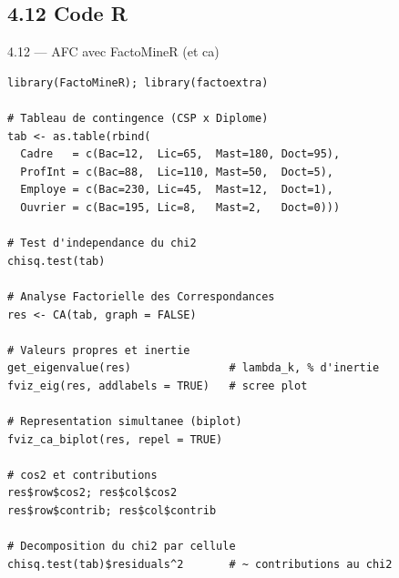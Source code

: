 \subsection{4.12 Code R}
\begin{frame}[fragile]{4.12 — AFC avec FactoMineR (et ca)}
\begin{lstlisting}
library(FactoMineR); library(factoextra)

# Tableau de contingence (CSP x Diplome)
tab <- as.table(rbind(
  Cadre   = c(Bac=12,  Lic=65,  Mast=180, Doct=95),
  ProfInt = c(Bac=88,  Lic=110, Mast=50,  Doct=5),
  Employe = c(Bac=230, Lic=45,  Mast=12,  Doct=1),
  Ouvrier = c(Bac=195, Lic=8,   Mast=2,   Doct=0)))

# Test d'independance du chi2
chisq.test(tab)

# Analyse Factorielle des Correspondances
res <- CA(tab, graph = FALSE)

# Valeurs propres et inertie
get_eigenvalue(res)               # lambda_k, % d'inertie
fviz_eig(res, addlabels = TRUE)   # scree plot

# Representation simultanee (biplot)
fviz_ca_biplot(res, repel = TRUE)

# cos2 et contributions
res$row$cos2; res$col$cos2
res$row$contrib; res$col$contrib

# Decomposition du chi2 par cellule
chisq.test(tab)$residuals^2       # ~ contributions au chi2
\end{lstlisting}
\end{frame}


